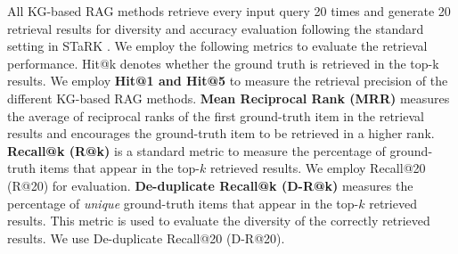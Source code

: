 All KG-based RAG methods retrieve every input query 20 times and generate 20 retrieval results for diversity and accuracy evaluation following the standard setting in STaRK \cite{wu2024stark}. 
We employ the following metrics to evaluate the retrieval performance. Hit@k denotes whether the ground truth is retrieved in the top-k results. We employ \textbf{Hit@1 and Hit@5} to measure the retrieval precision of the different KG-based RAG methods. \textbf{Mean Reciprocal Rank (MRR)} measures the average of reciprocal ranks of the first ground-truth item in the retrieval results and encourages the ground-truth item to be retrieved in a higher rank. \textbf{Recall@k (R@k)} is a standard metric to measure the percentage of ground-truth items that appear in the top-$k$ retrieved results. We employ Recall@20 (R@20) for evaluation. \textbf{De-duplicate Recall@k (D-R@k)} measures the percentage of \textit{unique} ground-truth items that appear in the top-$k$ retrieved results. This metric is used to evaluate the diversity of the correctly retrieved results. We use De-duplicate Recall@20 (D-R@20).
